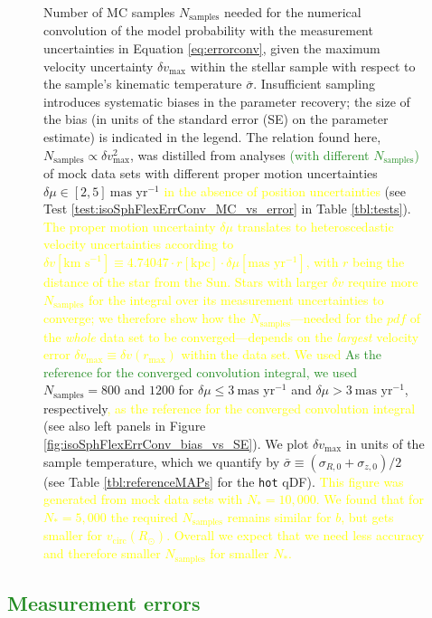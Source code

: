 \documentclass[iop,revtex4,numberedappendix,appendixfloats]{emulateapj}
\newcommand{\pdf}{\ensuremath{pdf}}
\newcommand{\NEW}[1]{\textcolor{ForestGreen}{#1}}
\newcommand{\OLD}[1]{\textcolor{Yellow}{#1}}%
\begin{document}
\begin{figure}[!htbp]
\caption{Number of MC samples $N_\text{samples}$ needed for the numerical convolution of the model probability with the measurement uncertainties in Equation \eqref{eq:errorconv}, given the maximum velocity uncertainty $\delta v_\text{max}$ within the stellar sample with respect to the sample's kinematic temperature $\bar{\sigma}$. Insufficient sampling introduces systematic biases in the parameter recovery; the size of the bias (in units of the standard error (SE) on the parameter estimate) is indicated in the legend. The relation found here, $N_\text{samples} \propto \delta v_\text{max}^2$, was distilled from analyses \NEW{(with different $N_\text{samples}$)} of mock data sets with different proper motion uncertainties $\delta \mu \in [2,5]~\text{mas yr}^{-1}$ \OLD{in the absence of position uncertainties} (see Test \ref{test:isoSphFlexErrConv_MC_vs_error} in Table \ref{tbl:tests}). \OLD{The proper motion uncertainty $\delta \mu$ translates to heteroscedastic velocity uncertainties according to $\delta v [\text{km s}^{-1}] \equiv 4.74047 \cdot r[\text{kpc}] \cdot \delta \mu [\text{mas yr}^{-1}]$, with $r$ being the distance of the star from the Sun. Stars with larger $\delta v$ require more $N_\text{samples}$ for the integral over its measurement uncertainties to converge; we therefore show how the $N_\text{samples}$---needed for the \pdf{} of the \emph{whole} data set to be converged---depends on the \emph{largest} velocity error $\delta v_\text{max} \equiv \delta v(r_\text{max})$ within the data set. We used} \NEW{As the reference for the converged convolution integral, we used} $N_\text{samples} = 800$ and  $1200$ for $\delta \mu \leq 3~\text{mas yr}^{-1}$ and $\delta \mu > 3~\text{mas yr}^{-1}$, respectively\OLD{, as the reference for the converged convolution integral} (see also left panels in Figure \ref{fig:isoSphFlexErrConv_bias_vs_SE}). We plot $\delta v_\text{max}$ in units of the sample temperature, which we quantify by $\bar{\sigma} \equiv (\sigma_{R,0} + \sigma_{z,0})/2$ (see Table \ref{tbl:referenceMAPs} for the \texttt{hot} qDF). \OLD{This figure was generated from mock data sets with $N_{*}=10,000$. We found that for $N_{*}=5,000$ the required $N_\text{samples}$ remains similar for $b$, but gets smaller for $v_\text{circ}(R_\odot)$. Overall we expect that we need less accuracy and therefore smaller $N_\text{samples}$ for smaller $N_{*}$.} }
\label{fig:isoSphFlexErrConv_MC_vs_error}
\end{figure}

\subsection{\NEW{Measurement errors}}
\end{document}
